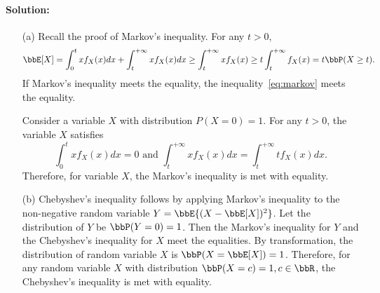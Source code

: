\documentclass[11pt]{article}
\theoremstyle{plain}
\theoremstyle{definition}
\begin{document}
\paragraph{Solution:} 
\begin{enumerate}
	\item[(a)] Recall the proof of Markov's inequality. For any $t >0$,
	\begin{equation}\label{eq:markov}
		\bbE[X] = \int_{0}^t x f_X(x) dx + \int_{t}^{+\infty} x f_X(x) dx \geq \int_{t}^{+\infty} x f_X(x)\geq t \int_{t}^{+\infty} f_X(x) = t \bbP( X \geq t).
	\end{equation}
	 If Markov's inequality meets the equality, the inequality~\eqref{eq:markov} meets the equality.
	 
	 Consider a variable $X$ with distribution $P(X = 0) = 1$. For any $t > 0$, the variable $X$ satisfies 
	 \[ \int_{0}^t x f_X(x) dx = 0 \text{ and } \int_{t}^{+\infty} x f_X(x) dx =\int_{t}^{+\infty} t f_X(x) dx. \]
	 Therefore, for variable $X$, the Markov's inequality is met with equality.
	 \item[(b)] Chebyshev's inequality follows by applying Markov's inequality to the non-negative random variable $Y = \bbE{(X - \bbE[X])^2}$. Let the distribution of $Y$ be $\bbP(Y = 0) = 1$. Then the Markov's inequality for $Y$ and the Chebyshev's inequality for $X$ meet the equalities. By transformation, the distribution of random variable $X$ is $\bbP(X = \bbE[X]) = 1$. Therefore, for any random variable $X$ with distribution $\bbP(X = c) = 1, c \in \bbR$, the Chebyshev's inequality is met with equality.
\end{enumerate}
\end{document}
